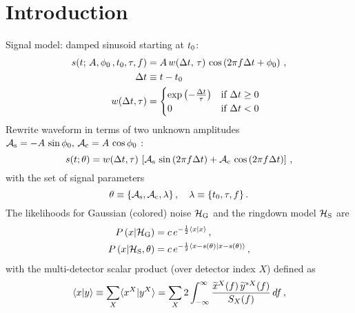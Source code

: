 \documentclass[aps,prd,onecolumn,notitlepage,nofootinbib,superscriptaddress,altaffilletter,floatfix]{revtex4-1}
\begin{document}
\maketitle

\section{Introduction}
\label{Intro}

Signal model: damped sinusoid starting at $t_0$:
\begin{align}
  \label{eq:1}
  s(t;\,A, \phi_0\,, t_0, \tau, f) &= A\,w(\Delta t,\,\tau)\,\cos\left(2\pi f \Delta t + \phi_0\right)\,,\\
  \Delta t & \equiv t - t_0\,\\
  w(\Delta t, \tau) &=
  \begin{cases}
    \exp\left( -\frac{\Delta t}{\tau} \right) & \text{if } \Delta t \ge 0\,\\
    0  & \text{if } \Delta t < 0
  \end{cases}
\end{align}
Rewrite waveform in terms of two unknown amplitudes $\mathcal{A}_{\mathrm{s}} = -A\,\sin\phi_0,\,\mathcal{A}_{\mathrm{c}} = A\,\cos\phi_0$ \cite{bretthorst1988:_bayesian_spectrum}:
\begin{equation}
  \label{eq:2}
  s(t; \theta) = w(\Delta t,\tau)\, \left[ \mathcal{A}_{\mathrm{s}}\,\sin\left(2\pi f \Delta t\right) + \mathcal{A}_{\mathrm{c}}\,\cos\left(2\pi f \Delta t\right) \right]\,,
\end{equation}
with the set of signal parameters
\begin{equation}
  \label{eq:11}
  \theta \equiv \{\mathcal{A}_{\mathrm{s}},\mathcal{A}_{\mathrm{c}}, \lambda\}\,,\quad \lambda \equiv \{t_0,\tau, f\}\,.
\end{equation}
The likelihoods for Gaussian (colored) noise $\mathcal{H}_{\mathrm{G}}$ and the ringdown model $\mathcal{H}_{\mathrm{S}}$ are
\begin{align}
  \label{eq:4}
  P\left(x|\mathcal{H}_{\mathrm{G}}\right) &= c\,e^{-\frac{1}{2}\langle x|x\rangle}\,,\\
  P\left(x|\mathcal{H}_{\mathrm{S}},\theta\right) &= c\,e^{-\frac{1}{2}\langle x-s(\theta)|x-s(\theta)\rangle}\,,
\end{align}
with the multi-detector scalar product (over detector index $X$) defined as
\begin{equation}
  \label{eq:5}
  \langle x|y\rangle\equiv \sum_{X} \langle x^X|y^X\rangle = \sum_X 2\int_{-\infty}^{\infty} \frac{\widetilde{x}^X(f)\,\widetilde{y}^{*X}(f)}{S_X(f)}\,df\,,
\end{equation}
\end{document}
